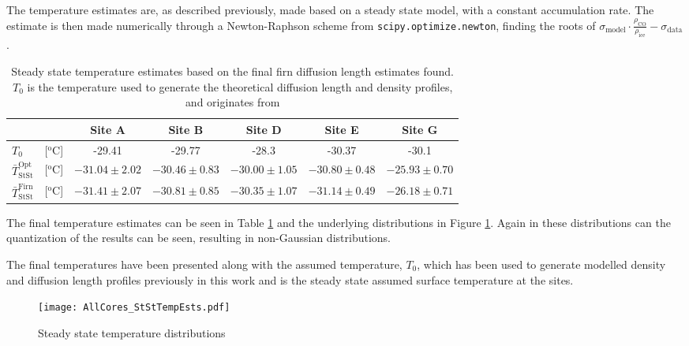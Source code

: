 \documentclass[../../CompleteThesis2/Complete_2ndDraft]{subfiles}
\begin{document}
The temperature estimates are, as described previously, made based on a steady state model, with a constant accumulation rate. The estimate is then made numerically through a Newton-Raphson scheme from \lstinline[language=Python]|scipy.optimize.newton|, finding the roots of $\sigma_{\text{model}}\cdot \frac{\rho_{\text{CO}}}{\rho_{\text{ice}}} - \sigma_{\text{data}}$.
\begin{table}[ht]
	\centering
	\begin{tabular}{l c|c|c|c|c|c}
		& & Site A & Site B & Site D & Site E & Site G \\
		\hline
		\hline
		$T_0$ & [$^{\text{o}}$C] & -29.41 & -29.77 & -28.3 & -30.37 & -30.1 \\[0.1cm]
		$\bar{T}_{\text{StSt}}^{\text{Opt}}$ & [$^{\text{o}}$C] & $-31.04 \pm 2.02$ & $-30.46 \pm 0.83$ & $-30.00 \pm 1.05$ & $-30.80 \pm 0.48$ & $-25.93 \pm 0.70$ \\[0.5cm]
		$\bar{T}_{\text{StSt}}^{\text{Firn}}$ & [$^{\text{o}}$C] & $-31.41 \pm 2.07$ & $-30.81 \pm 0.85$ & $-30.35 \pm 1.07$ & $-31.14 \pm 0.49$ & $-26.18 \pm 0.71$ \\[0.15cm]
	\end{tabular}
	\caption[Steady state temperature estimates]{\small Steady state temperature estimates based on the final firn diffusion length estimates found. $T_0$ is the temperature used to generate the theoretical diffusion length and density profiles, and originates from \cite[H. Clausen et al., 1988]{Clausen1988a}}
	\label{Tab:TempEstStSt}
\end{table}

The final temperature estimates can be seen in Table \ref{Tab:TempEstStSt} and the underlying distributions in Figure \ref{fig:AllCores_StStTempEsts}. Again in these distributions can the quantization of the results can be seen, resulting in non-Gaussian distributions.

The final temperatures have been presented along with the assumed temperature, $T_0$, which has been used to generate modelled density and diffusion length profiles previously in this work and is the steady state assumed surface temperature at the sites.
\begin{figure}[h]
	\centering
	\texttt{[image: AllCores\_StStTempEsts.pdf]}
	\caption[Steady state temperature distributions]{\small Steady state temperature distributions}
	\label{fig:AllCores_StStTempEsts}
\end{figure}


\end{document}
